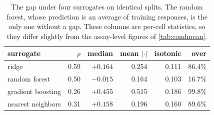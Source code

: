 \documentclass{article}
\theoremstyle{plain}
\theoremstyle{definition}
\begin{document}
\begin{table}[ht]
\caption{The gap under four surrogates on identical splits. The random forest, whose
prediction is an average of training responses, is the only one without a gap. These
columns are per-cell statistics, so they differ slightly from the assay-level figures
of \cref{tab:condmean}.}
\label{tab:surrogates}
\vskip 0.1in
\begin{center}
\begin{small}
\begin{tabular}{lrrrrr}
\toprule
surrogate & $\rho$ & median & mean $|\cdot|$ & isotonic & over \\
\midrule
ridge             & 0.59 & $+0.164$ & 0.254 & 0.111 & 86.4\% \\
random forest     & 0.50 & $-0.015$ & 0.164 & 0.103 & 16.7\% \\
gradient boosting & 0.26 & $+0.455$ & 0.515 & 0.186 & 99.8\% \\
nearest neighbors & 0.31 & $+0.158$ & 0.196 & 0.160 & 89.6\% \\
\bottomrule
\end{tabular}
\end{small}
\end{center}
\vskip -0.1in
\end{table}
\end{document}

